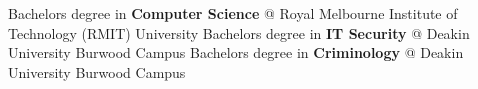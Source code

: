 %
%
%


\begin{scholarship}
					{Bachelors degree in \textbf{Computer Science} @ Royal Melbourne Institute of Technology (RMIT) University }
					{Bachelors degree in \textbf{IT Security} @ Deakin University Burwood Campus}
					{Bachelors degree in \textbf{Criminology} @ Deakin University Burwood Campus}
\end{scholarship}